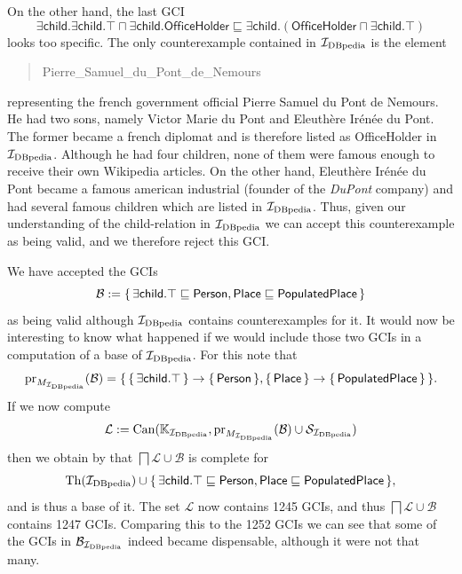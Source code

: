 On the other hand, the last GCI
\begin{equation*}
  \mathsf{\exists child. \exists child. \top \sqcap \exists child. OfficeHolder
    \sqsubseteq \exists child. ( OfficeHolder \sqcap \exists child. \top ) }
\end{equation*}
looks too specific.  The only counterexample contained in ${\mathcal{I}_{\text{DBpedia}}}$ is the element
\begin{quote}
  \textsf{Pierre\_Samuel\_du\_Pont\_de\_Nemours}
\end{quote}
representing the french government official Pierre Samuel du Pont de Nemours.  He had two
sons, namely Victor Marie du Pont and Eleuthère Irénée du Pont.  The former became a
french diplomat and is therefore listed as \textsf{OfficeHolder} in ${\mathcal{I}_{\text{DBpedia}}}$.  Although
he had four children, none of them were famous enough to receive their own Wikipedia
articles.  On the other hand, Eleuthère Irénée du Pont became a famous american industrial
(founder of the \emph{DuPont} company) and had several famous children which are listed in
${\mathcal{I}_{\text{DBpedia}}}$.  Thus, given our understanding of the \textsf{child}-relation in ${\mathcal{I}_{\text{DBpedia}}}$
we can accept this counterexample as being valid, and we therefore reject this GCI.

We have accepted the GCIs
\begin{equation*}
  \mathcal{B} := {\{\, \mathsf{\exists child. \top \sqsubseteq Person},
    \mathsf{Place \sqsubseteq PopulatedPlace} \,\}}
\end{equation*}
as being valid although ${\mathcal{I}_{\text{DBpedia}}}$ contains counterexamples for it.  It would now be
interesting to know what happened if we would include those two GCIs in a computation of a
base of ${\mathcal{I}_{\text{DBpedia}}}$.  For this note that
\begin{equation*}
  \operatorname{pr}_{M_{{\mathcal{I}_{\text{DBpedia}}}}}(\mathcal{B}) = {\{\, {\{\, \mathsf{\exists child. \top} \,\}} \to {\ensuremath{\{\,
      \mathsf{Person} \,\}}}, {\{\, \mathsf{Place} \,\}} \to {\ensuremath{\{\, \mathsf{PopulatedPlace} \,\}}} \,\}}.
\end{equation*}
If we now compute
\begin{equation*}
  \mathcal{L} := \operatorname{Can}({\mathbb{K}}_{\mathcal{I}_{\text{DBpedia}}}, \operatorname{pr}_{M_{{\mathcal{I}_{\text{DBpedia}}}}}(\mathcal{B}) \cup
  \mathcal{S}_{{\mathcal{I}_{\text{DBpedia}}}} )
\end{equation*}
then we obtain by  that $\bigsqcap \mathcal{L}
\cup \mathcal{B}$ is complete for
\begin{equation*}
  \operatorname{Th}({\mathcal{I}_{\text{DBpedia}}}) \cup {\ensuremath{\{\, \mathsf{\exists child. \top \sqsubseteq Person },
    \mathsf{Place \sqsubseteq PopulatedPlace} \,\}}},
\end{equation*}
and is thus a base of it.  The set $\mathcal{L}$ now contains 1245 GCIs, and thus
$\bigsqcap \mathcal{L} \cup \mathcal{B}$ contains 1247 GCIs.  Comparing this to the 1252
GCIs we can see that some of the GCIs in $\mathcal{B}_{\mathcal{I}_{\text{DBpedia}}}$ indeed became
dispensable, although it were not that many.

